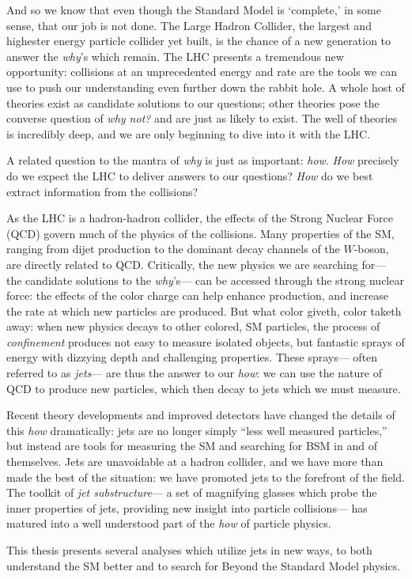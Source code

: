 And so we know that even though the Standard Model is `complete,' in some sense, that our job is not done. The Large Hadron Collider, the largest and highester energy particle collider yet built, is the chance of a new generation to answer the \textit{why}'s which remain. The LHC presents a tremendous new opportunity: collisions at an unprecedented energy and rate are the tools we can use to push our understanding even further down the rabbit hole. A whole host of theories exist as candidate solutions to our questions; other theories pose the converse question of \textit{why not?} and are just as likely to exist. The well of theories is incredibly deep, and we are only beginning to dive into it with the LHC.

A related question to the mantra of \textit{why} is just as important: \textit{how}. \textit{How} precisely do we expect the LHC to deliver answers to our questions? \textit{How} do we best extract information from the collisions?

As the LHC is a hadron-hadron collider, the effects of the Strong Nuclear Force (QCD) govern much of the physics of the collisions. Many properties of the SM, ranging from dijet production to the dominant decay channels of the $W$-boson, are directly related to QCD. Critically, the new physics we are searching for--- the candidate solutions to the \textit{why}'s--- can be accessed through the strong nuclear force: the effects of the color charge can help enhance production, and increase the rate at which new particles are produced. But what color giveth, color taketh away: when new physics decays to other colored, SM particles, the process of \textit{confinement} produces not easy to measure isolated objects, but fantastic sprays of energy with dizzying depth and challenging properties. These sprays--- often referred to as \textit{jets}--- are thus the answer to our \textit{how}: we can use the nature of QCD to produce new particles, which then decay to jets which we must measure.

Recent theory developments and improved detectors have changed the details of this \textit{how} dramatically: jets are no longer simply ``less well measured particles,'' but instead are tools for measuring the SM and searching for BSM in and of themselves. Jets are unavoidable at a hadron collider, and we have more than made the best of the situation: we have promoted jets to the forefront of the field. The toolkit of \textit{jet substructure}--- a set of magnifying glasses which probe the inner properties of jets, providing new insight into particle collisions--- has matured into a well understood part of the \textit{how} of particle physics.

This thesis presents several analyses which utilize jets in new ways, to both understand the SM better and to search for Beyond the Standard Model physics.  